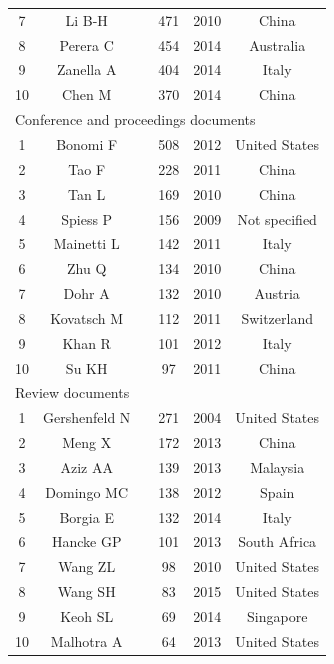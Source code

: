 \documentclass[symmetry,article,accept,moreauthors,pdftex10pt,a4paper]{mdpi}
\begin{document}
\begin{table}[H]
\begin{tabular}{cccccc}
	7 & Li B-H & \cite{Li2010} & 471 & 2010 & China \\
	8 & Perera C & \cite{Perera2014414} & 454 & 2014 & Australia \\
	9 & Zanella A & \cite{Zanella201422} & 404 & 2014 & Italy \\
	10 & Chen M & \cite{Chen2014171} & 370 & 2014 & China \\  \midrule
	\multicolumn{6}{l}{Conference and proceedings documents} \\
    \midrule
	1 & Bonomi F & \cite{Bonomi201213} & 508 & 2012 & United States \\
	2 & Tao F & \cite{Tao20111969} & 228 & 2011 & China \\
	3 & Tan L & \cite{Tan2010} & 169 & 2010 & China \\
	4 & Spiess P & \cite{Spiess2009968} & 156 & 2009 & Not specified \\
	5 & Mainetti L & \cite{Mainetti201116} & 142 & 2011 & Italy \\
	6 & Zhu Q & \cite{Zhu2010347} & 134 & 2010 & China \\
	7 & Dohr A & \cite{Dohr2010804} & 132 & 2010 & Austria \\
	8 & Kovatsch M & \cite{Kovatsch2011855} & 112 & 2011 & Switzerland \\
	9 & Khan R & \cite{Khan2012257} & 101 & 2012 & Italy \\
	10 & Su KH & \cite{Su20111028} & 97 & 2011 & China \\  \midrule
	\multicolumn{6}{l}{Review documents} \\
    \midrule
	1 & Gershenfeld N & \cite{Gershenfeld200476} & 271 & 2004 & United States \\
	2 & Meng X & \cite{Meng2013146} & 172 & 2013 & China \\
	3 & Aziz AA & \cite{Aziz2013121} & 139 & 2013 & Malaysia \\
	4 & Domingo MC & \cite{Domingo2012584} & 138 & 2012 & Spain \\
	5 & Borgia E & \cite{Borgia20141} & 132 & 2014 & Italy \\
	6 & Hancke GP & \cite{Hancke2013393} & 101 & 2013 & South Africa \\
	7 & Wang ZL & \cite{Wang2010320} & 98 & 2010 & United States \\
	8 & Wang SH & \cite{Wang2015436} & 83 & 2015 & United States \\
	9 & Keoh SL & \cite{Keoh2014265} & 69 & 2014 & Singapore \\
	10 & Malhotra A & \cite{Malhotra20131265} & 64 & 2013 & United States\\
   	\bottomrule
	\end{tabular}
	\end{table}
\end{document}
